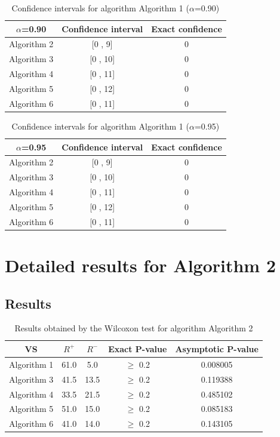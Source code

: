 \documentclass[a4paper,10pt]{article}
\begin{document}
\begin{table}[!htp]
\centering\small
\begin{tabular}{
|c|c|c|}
\hline
 $\alpha$=0.90 & Confidence interval & Exact confidence \\ \hline 
Algorithm 2 & [0 , 9] & 0\\ \hline 
Algorithm 3 & [0 , 10] & 0\\ \hline 
Algorithm 4 & [0 , 11] & 0\\ \hline 
Algorithm 5 & [0 , 12] & 0\\ \hline 
Algorithm 6 & [0 , 11] & 0\\ \hline 

\end{tabular}
\caption{Confidence intervals for algorithm Algorithm 1 ($\alpha$=0.90)}
\end{table}
\begin{table}[!htp]
\centering\small
\begin{tabular}{
|c|c|c|}
\hline
 $\alpha$=0.95 & Confidence interval & Exact confidence \\ \hline 
Algorithm 2 & [0 , 9] & 0\\ \hline 
Algorithm 3 & [0 , 10] & 0\\ \hline 
Algorithm 4 & [0 , 11] & 0\\ \hline 
Algorithm 5 & [0 , 12] & 0\\ \hline 
Algorithm 6 & [0 , 11] & 0\\ \hline 

\end{tabular}
\caption{Confidence intervals for algorithm Algorithm 1 ($\alpha$=0.95)}
\end{table}

 \clearpage 


\section{Detailed results for Algorithm 2}


\subsection{Results}

\begin{table}[!htp]
\centering\small
\begin{tabular}{
|c|c|c|c|c|}
\hline
 VS & $R^{+}$ & $R^{-}$ & Exact P-value & Asymptotic P-value \\ \hline 
Algorithm 1 & 61.0 & 5.0 & $\geq$ 0.2 & 0.008005\\ \hline 
Algorithm 3 & 41.5 & 13.5 & $\geq$ 0.2 & 0.119388\\ \hline 
Algorithm 4 & 33.5 & 21.5 & $\geq$ 0.2 & 0.485102\\ \hline 
Algorithm 5 & 51.0 & 15.0 & $\geq$ 0.2 & 0.085183\\ \hline 
Algorithm 6 & 41.0 & 14.0 & $\geq$ 0.2 & 0.143105\\ \hline 

\end{tabular}
\caption{Results obtained by the Wilcoxon test for algorithm Algorithm 2}
\end{table}
\end{document}
